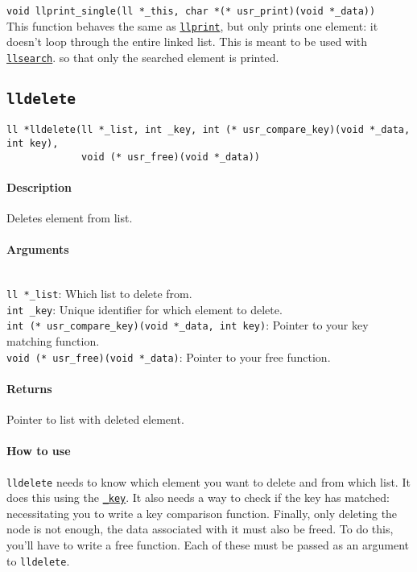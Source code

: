 \documentclass{article}
\begin{document}
\verb|void llprint_single(ll *_this, char *(* usr_print)(void *_data))|\\[8pt]
This function behaves the same as \hyperref[llprint]{\texttt{llprint}}, but only prints one element:
it doesn't loop through the entire linked list. This is meant to be used with
\hyperref[llsearch]{\texttt{llsearch}}. so that only the searched element is printed. 


\subsection{\texttt{lldelete}}
\label{lldelete}

\begin{verbatim}
ll *lldelete(ll *_list, int _key, int (* usr_compare_key)(void *_data, int key), 
             void (* usr_free)(void *_data))
\end{verbatim}

\paragraph{Description}
Deletes element from list.

\paragraph{Arguments}
\verb| |\\
\verb|ll *_list|: Which list to delete from.\\
\verb|int _key|: Unique identifier for which element to delete.\\
\verb|int (* usr_compare_key)(void *_data, int key)|: Pointer to your key matching function.\\
\verb|void (* usr_free)(void *_data)|: Pointer to your free function.

\paragraph{Returns}

Pointer to list with deleted element.

\paragraph{How to use}

\texttt{lldelete} needs to know which element you want to delete and from which list. It does this
using the \hyperref[key]{\texttt{\_key}}. It also needs a way to check if the key has matched: necessitating you to
write a key comparison function. Finally, only deleting the node is not enough, the data associated
with it must also be freed. To do this, you'll have to write a free function. Each of these must be
passed as an argument to \texttt{lldelete}.
\end{document}
